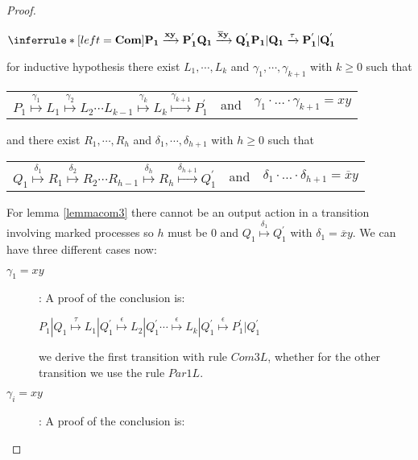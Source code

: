 \begin{proposition}
\begin{proof}
\begin{description}
	\begin{center}
	  $\inferrule* [left=\bf{Com}]{
	      P_{1} \xrightarrow{xy} P_{1}^{'}
	    \\
	      Q_{1} \xrightarrow{\overline{x}y} Q_{1}^{'}
	  }{
	    P_{1}|Q_{1} \xrightarrow{\tau} P_{1}^{'}|Q_{1}^{'}
	  }$
	\end{center}
	for inductive hypothesis there exist $L_{1}, \cdots, L_{k}$ and $\gamma_{1}, \cdots, \gamma_{k+1}$ with $k\geq 0$ such that 
	\begin{center}
	  \begin{tabular}{lll}
	    $P_{1} \stackrel{\gamma_{1}}{\longmapsto} L_{1}  \stackrel{\gamma_{2}}{\longmapsto} L_{2} \cdots L_{k-1} \stackrel{\gamma_{k}}{\longmapsto} L_{k} \stackrel{\gamma_{k+1}}{\longmapsto} P_{1}^{'}$ 
	  &
	    and
	  &
	    $\gamma_{1} \cdot \ldots \cdot \gamma_{k+1} = xy$
	  \end{tabular}
	\end{center}
	and there exist $R_{1}, \cdots, R_{h}$ and $\delta_{1}, \cdots, \delta_{h+1}$ with $h\geq 0$ such that 
	\begin{center}
	  \begin{tabular}{lll}
	    $Q_{1} \stackrel{\delta_{1}}{\longmapsto} R_{1}  \stackrel{\delta_{2}}{\longmapsto} R_{2} \cdots R_{h-1} \stackrel{\delta_{h}}{\longmapsto} R_{h} \stackrel{\delta_{h+1}}{\longmapsto} Q_{1}^{'}$ 
	  &
	    and
	  &
	    $\delta_{1} \cdot \ldots \cdot \delta_{h+1} = \overline{x}y$
	  \end{tabular}
	\end{center}
	For lemma \ref{lemmacom3} there cannot be an output action in a transition involving marked processes so $h$ must be $0$ and $Q_{1} \stackrel{\delta_{1}}{\longmapsto} Q_{1}^{'}$ with $\delta_{1}=\overline{x}y$. We can have three different cases now: 
	\begin{description}
	  \item[$\gamma_{1}=xy$]:
	    A proof of the conclusion is:
	    \begin{center}
	      $P_{1}|Q_{1} \stackrel{\tau}{\longmapsto} L_{1}|Q_{1}^{'}
			      \stackrel{\epsilon}{\longmapsto} L_{2}|Q_{1}^{'}
		  \cdots
				\stackrel{\epsilon}{\longmapsto} L_{k}|Q_{1}^{'}
				\stackrel{\epsilon}{\longmapsto} P_{1}^{'}|Q_{1}^{'}$	  
	    \end{center}
	    we derive the first transition with rule $Com3L$, whether for the other transition we use the rule $Par1L$.
	  \item[$\gamma_{i}=xy$]:
	    A proof of the conclusion is:
	    \begin{center}

\end{center}
\end{description}
\end{description}
\end{proof}
\end{proposition}
